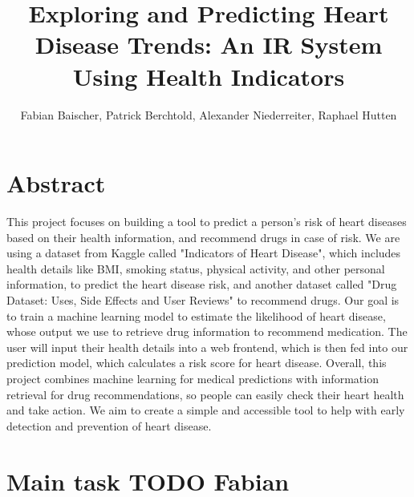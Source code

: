\documentclass{article}
\title{Exploring and Predicting Heart Disease Trends: An IR System Using  Health Indicators}
\author{Fabian Baischer, Patrick Berchtold, Alexander Niederreiter, Raphael Hutten}
\begin{document}
\maketitle


\section{Abstract}

This project focuses on building a tool to predict a person’s risk of heart diseases based on their health information,
and recommend drugs in case of risk.
We are using a dataset from Kaggle called "Indicators of Heart Disease",
which includes health details like BMI, smoking status, physical activity, and other personal information,
to predict the heart disease risk,
and another dataset called "Drug Dataset: Uses, Side Effects and User Reviews" to recommend drugs.
Our goal is to train a machine learning model to estimate the likelihood of heart disease,
whose output we use to retrieve drug information to recommend medication.
The user will input their health details into a web frontend,
which is then fed into our prediction model,
which calculates a risk score for heart disease.
Overall, this project combines machine learning for medical predictions with information retrieval for drug recommendations,
so people can easily check their heart health and take action.
We aim to create a simple and accessible tool to help with early detection and prevention of heart disease.


\section{Main task TODO Fabian}
\end{document}
